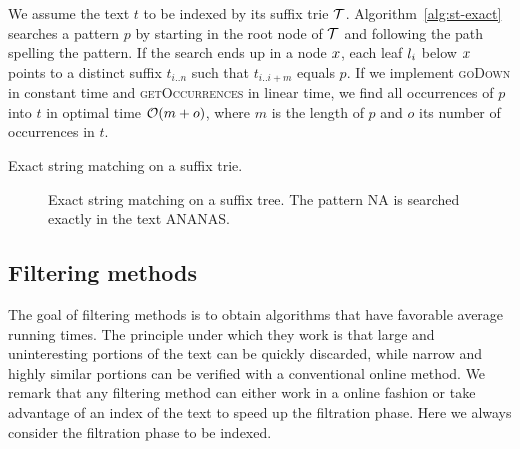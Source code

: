 We assume the text $t$ to be indexed by its suffix trie $\mathcal {T}$.
Algorithm~\ref{alg:st-exact} searches a pattern $p$ by starting in the root node of $\mathcal {T}$ and following the path spelling the pattern.
If the search ends up in a node $x$, each leaf $l_i$ below $x$ points to a distinct suffix $t_{i..n}$ such that $t_{i..i+m}$ equals $p$.
If we implement \textsc{goDown} in constant time and \textsc{getOccurrences} in linear time, we find all occurrences of $p$ into $t$ in optimal time $\mathcal{O}(m+o)$, where $m$ is the length of $p$ and $o$ its number of occurrences in $t$.

\begin{algorithm}[h]
\caption{Exact string matching on a suffix trie.}
\label{alg:st-exact}
\begin{algorithmic}[1]
		\State \Report {}
	\Else
			\State {}
		\EndIf
	\EndIf
\EndProcedure
\end{algorithmic}
\end{algorithm}

\begin{figure}[h]
\begin{center}
\caption[Exact string matching on a suffix tree.]{Exact string matching on a suffix tree. The pattern NA is searched exactly in the text ANANAS.}
\label{fig:st-exact}

\end{center}
\end{figure}



\subsection{Filtering methods}
\label{sec:intro:filtering}

The goal of filtering methods is to obtain algorithms that have favorable average running times.
The principle under which they work is that large and uninteresting portions of the text can be quickly discarded, while narrow and highly similar portions can be verified with a conventional online method.
We remark that any filtering method can either work in a online fashion or take advantage of an index of the text to speed up the filtration phase.
Here we always consider the filtration phase to be indexed.

